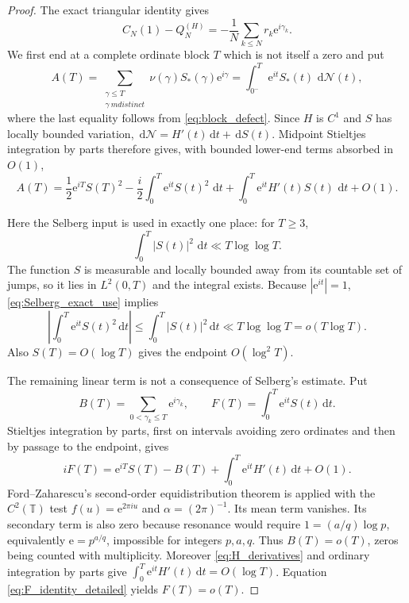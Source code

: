 \documentclass[11pt]{amsart}
\theoremstyle{definition}
\theoremstyle{remark}
\newcommand{\dd}{\,\mathrm d}
\newcommand{\ee}{\mathrm e}
\begin{document}
\begin{proof}
The exact triangular identity gives
\begin{equation}\label{eq:CQ_exact}
C_N(1)-Q_N^{(H)}=-\frac1N\sum_{k\le N}r_k\ee^{i\gamma_k}.
\end{equation}
We first end at a complete ordinate block $T$ which is not itself a zero and
put
\[
A(T)=\sum_{\substack{\gamma\le T\\\gamma\ {
m distinct}}}
\nu(\gamma)S_*(\gamma)\ee^{i\gamma}
=\int_{0^-}^{T}\ee^{it}S_*(t)\,\dd\mathcal N(t),
\]
where the last equality follows from \eqref{eq:block_defect}.  Since $H$ is
$C^1$ and $S$ has locally bounded variation,
$\dd\mathcal N=H'(t)\dd t+\dd S(t)$.  Midpoint Stieltjes integration by parts
therefore gives, with bounded lower-end terms absorbed in $O(1)$,
\begin{equation}\label{eq:level_one_core}
A(T)=\frac12\ee^{iT}S(T)^2
-\frac{i}{2}\int_0^T\ee^{it}S(t)^2\,\dd t
+\int_0^T\ee^{it}H'(t)S(t)\,\dd t+O(1).
\end{equation}

Here the Selberg input is used in exactly one place: for $T\ge3$,
\begin{equation}\label{eq:Selberg_exact_use}
\int_0^T|S(t)|^2\,\dd t\ll T\log\log T.
\end{equation}
The function $S$ is measurable and locally bounded away from its countable
set of jumps, so it lies in $L^2(0,T)$ and the integral exists.  Because
$|\ee^{it}|=1$, \eqref{eq:Selberg_exact_use} implies
\[
\left|\int_0^T\ee^{it}S(t)^2\dd t\right|
\le\int_0^T|S(t)|^2\dd t\ll T\log\log T=o(T\log T).
\]
Also $S(T)=O(\log T)$ gives the endpoint $O(\log^2T)$.

The remaining linear term is not a consequence of Selberg's estimate.  Put
\[
B(T)=\sum_{0<\gamma_k\le T}\ee^{i\gamma_k},
\qquad F(T)=\int_0^T\ee^{it}S(t)\dd t.
\]
Stieltjes integration by parts, first on intervals avoiding zero ordinates and
then by passage to the endpoint, gives
\begin{equation}\label{eq:F_identity_detailed}
iF(T)=\ee^{iT}S(T)-B(T)+\int_0^T\ee^{it}H'(t)\dd t+O(1).
\end{equation}
Ford--Zaharescu's second-order equidistribution theorem
\cite{FordZaharescu2005} is applied with the
$C^2(\mathbb T)$ test $f(u)=\ee^{2\pi iu}$ and
$\alpha=(2\pi)^{-1}$.  Its mean term vanishes.  Its secondary term is also
zero because resonance would require $1=(a/q)\log p$, equivalently
$\ee=p^{a/q}$, impossible for integers $p,a,q$.  Thus
$B(T)=o(T)$, zeros being counted with multiplicity.  Moreover
\eqref{eq:H_derivatives} and ordinary integration by parts give
$\int_0^T\ee^{it}H'(t)\dd t=O(\log T)$.  Equation
\eqref{eq:F_identity_detailed} yields $F(T)=o(T)$.


\end{proof}
\end{document}
